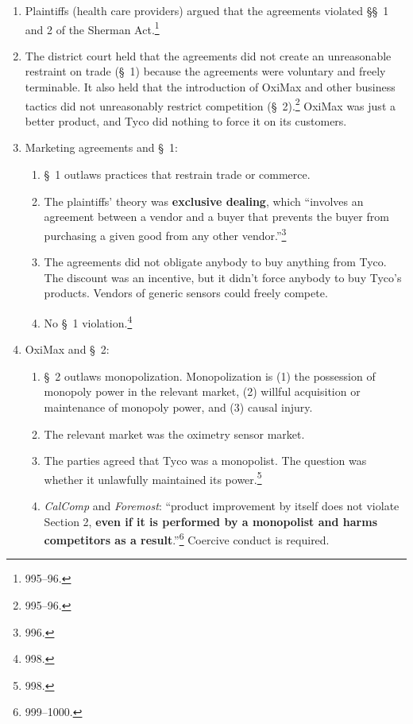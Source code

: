 \begin{enumerate}
\begin{enumerate}
    \end{enumerate}
    \item Plaintiffs (health care providers) argued that the agreements 
    violated \S\S\ 1 and 2 of the Sherman Act.\footnote{995--96.}
    \item The district court held that the agreements did not create an 
    unreasonable restraint on trade (\S\ 1) because the agreements were 
    voluntary and freely terminable. It also held that the introduction of 
    OxiMax and other business tactics did not unreasonably restrict 
    competition (\S\ 2).\footnote{995--96.} OxiMax was just a better product, 
    and Tyco did nothing to force it on its customers.
    \item Marketing agreements and \S\ 1:
    \begin{enumerate}
        \item \S\ 1 outlaws practices that restrain trade or commerce.
        \item The plaintiffs' theory was \textbf{exclusive dealing}, which 
        ``involves an agreement between a vendor and a buyer that prevents the 
        buyer from purchasing a given good from any other 
        vendor.''\footnote{996.}
        \item The agreements did not obligate anybody to buy anything from 
        Tyco. The discount was an incentive, but it didn't force anybody to 
        buy Tyco's products. Vendors of generic sensors could freely compete.
        \item No \S\ 1 violation.\footnote{998.}
    \end{enumerate}
    \item OxiMax and \S\ 2:
    \begin{enumerate}
        \item \S\ 2 outlaws monopolization. Monopolization is (1) the 
        possession of monopoly power in the relevant market, (2) willful 
        acquisition or maintenance of monopoly power, and (3) causal injury.
        \item The relevant market was the oximetry sensor market.
        \item The parties agreed that Tyco was a monopolist. The question was 
        whether it unlawfully maintained its power.\footnote{998.}
        \item \emph{CalComp} and \emph{Foremost}: ``product improvement by 
        itself does not violate Section 2, \textbf{even if it is performed by 
        a monopolist and harms competitors as a 
        result}.''\footnote{999--1000.} Coercive conduct is required.

\end{enumerate}
\end{enumerate}

